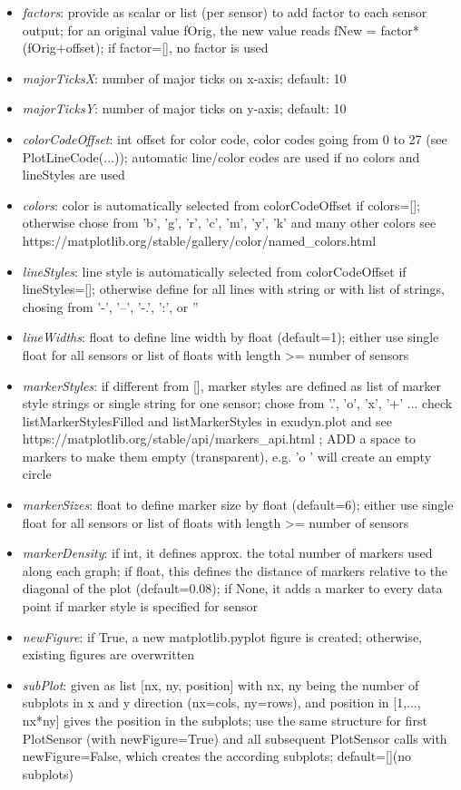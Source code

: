 \begin{itemize}[leftmargin=0.7cm]
\begin{itemize}[leftmargin=1.2cm]
\item[]{\it factors}: provide as scalar or list (per sensor) to add factor to each sensor output; for an original value fOrig, the new value reads fNew = factor*(fOrig+offset); if factor=[], no factor is used
\item[]{\it majorTicksX}: number of major ticks on x-axis; default: 10
\item[]{\it majorTicksY}: number of major ticks on y-axis; default: 10
\item[]{\it colorCodeOffset}: int offset for color code, color codes going from 0 to 27 (see PlotLineCode(...)); automatic line/color codes are used if no colors and lineStyles are used
\item[]{\it colors}: color is automatically selected from colorCodeOffset if colors=[]; otherwise chose from 'b', 'g', 'r', 'c', 'm', 'y', 'k' and many other colors see https://matplotlib.org/stable/gallery/color/named\_colors.html
\item[]{\it lineStyles}: line style is automatically selected from colorCodeOffset if lineStyles=[]; otherwise define for all lines with string or with list of strings, chosing from '-', '--', '-.', ':', or ''
\item[]{\it lineWidths}: float to define line width by float (default=1); either use single float for all sensors or list of floats with length >= number of sensors
\item[]{\it markerStyles}: if different from [], marker styles are defined as list of marker style strings or single string for one sensor; chose from '.', 'o', 'x', '+' ... check listMarkerStylesFilled and listMarkerStyles in exudyn.plot and see https://matplotlib.org/stable/api/markers\_api.html ; ADD a space to markers to make them empty (transparent), e.g. 'o ' will create an empty circle
\item[]{\it markerSizes}: float to define marker size by float (default=6); either use single float for all sensors or list of floats with length >= number of sensors
\item[]{\it markerDensity}: if int, it defines approx. the total number of markers used along each graph; if float, this defines the distance of markers relative to the diagonal of the plot (default=0.08); if None, it adds a marker to every data point if marker style is specified for sensor
\item[]{\it newFigure}: if True, a new matplotlib.pyplot figure is created; otherwise, existing figures are overwritten
\item[]{\it subPlot}: given as list [nx, ny, position] with nx, ny being the number of subplots in x and y direction (nx=cols, ny=rows), and position in [1,..., nx*ny] gives the position in the subplots; use the same structure for first PlotSensor (with newFigure=True) and all subsequent PlotSensor calls with newFigure=False, which creates the according subplots; default=[](no subplots)

\end{itemize}
\end{itemize}
